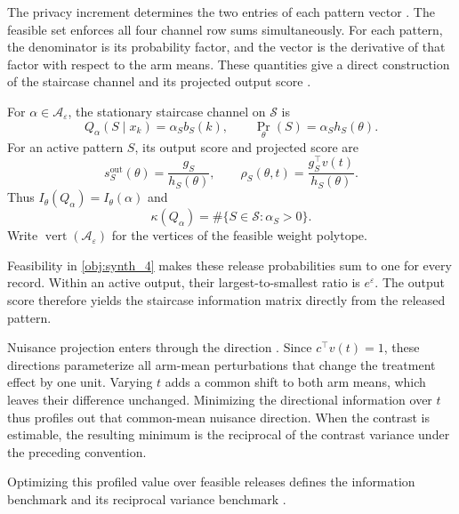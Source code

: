 \documentclass[11pt]{article}
\begin{document}
The privacy increment  determines the two entries of each pattern vector . The feasible set  enforces all four channel row sums simultaneously. For each pattern, the denominator  is its probability factor, and the vector  is the derivative of that factor with respect to the arm means. These quantities give a direct construction of the staircase channel  and its projected output score .

For \(\alpha\in\mathcal A_\varepsilon\), the stationary staircase channel on \(\mathcal S\) is
\[
Q_\alpha(S\mid x_k)=\alpha_S b_S(k),
\qquad
\Pr_\theta(S)=\alpha_S h_S(\theta).
\]
For an active pattern \(S\), its output score and projected score are
\[
s_S^{\mathrm{out}}(\theta)=\frac{g_S}{h_S(\theta)},
\qquad
\rho_S(\theta,t)=\frac{g_S^\top v(t)}{h_S(\theta)}.
\]
Thus \(I_\theta(Q_\alpha)=I_\theta(\alpha)\) and
\[
\kappa(Q_\alpha)=\#\{S\in\mathcal S:\alpha_S>0\}.
\]
Write \(\operatorname{vert}(\mathcal A_\varepsilon)\) for the vertices of the feasible weight polytope.

Feasibility in \cref{obj:synth_4} makes these release probabilities sum to one for every record. Within an active output, their largest-to-smallest ratio is \(e^\varepsilon\). The output score  therefore yields the staircase information matrix  directly from the released pattern.

Nuisance projection enters through the direction . Since \(c^\top v(t)=1\), these directions parameterize all arm-mean perturbations that change the treatment effect by one unit. Varying \(t\) adds a common shift to both arm means, which leaves their difference unchanged. Minimizing the directional information  over \(t\) thus profiles out that common-mean nuisance direction. When the contrast is estimable, the resulting minimum is the reciprocal of the contrast variance under the preceding convention.

Optimizing this profiled value over feasible releases defines the information benchmark  and its reciprocal variance benchmark .
\end{document}
